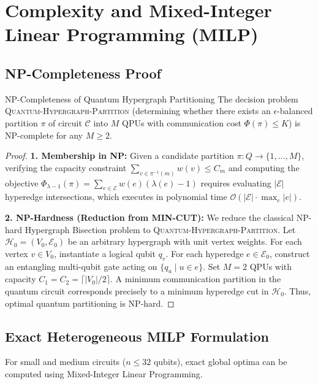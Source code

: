 \section{Complexity and Mixed-Integer Linear Programming (MILP)}
\label{sec:milp_formulation}

\subsection{NP-Completeness Proof}
\begin{theorembox}{NP-Completeness of Quantum Hypergraph Partitioning}
The decision problem \textsc{Quantum-Hypergraph-Partition} (determining whether there exists an $\epsilon$-balanced partition $\pi$ of circuit $\mathcal{C}$ into $M$ QPUs with communication cost $\Phi(\pi) \le K$) is NP-complete for any $M \ge 2$.
\end{theorembox}

\begin{proof}
\textbf{1. Membership in NP:} Given a candidate partition $\pi: Q \to \{1, \dots, M\}$, verifying the capacity constraint $\sum_{v \in \pi^{-1}(m)} w(v) \le C_m$ and computing the objective $\Phi_{\lambda-1}(\pi) = \sum_{e \in \mathcal{E}} w(e)(\lambda(e) - 1)$ requires evaluating $|\mathcal{E}|$ hyperedge intersections, which executes in polynomial time $\mathcal{O}(|\mathcal{E}| \cdot \max_e |e|)$.

\textbf{2. NP-Hardness (Reduction from MIN-CUT):} We reduce the classical NP-hard Hypergraph Bisection problem to \textsc{Quantum-Hypergraph-Partition}. Let $\mathcal{H}_0 = (V_0, \mathcal{E}_0)$ be an arbitrary hypergraph with unit vertex weights. For each vertex $v \in V_0$, instantiate a logical qubit $q_v$. For each hyperedge $e \in \mathcal{E}_0$, construct an entangling multi-qubit gate acting on $\{q_u \mid u \in e\}$. Set $M = 2$ QPUs with capacity $C_1 = C_2 = \lceil |V_0|/2 \rceil$. A minimum communication partition in the quantum circuit corresponds precisely to a minimum hyperedge cut in $\mathcal{H}_0$. Thus, optimal quantum partitioning is NP-hard.
\end{proof}

\subsection{Exact Heterogeneous MILP Formulation}
For small and medium circuits ($n \le 32$ qubits), exact global optima can be computed using Mixed-Integer Linear Programming.

